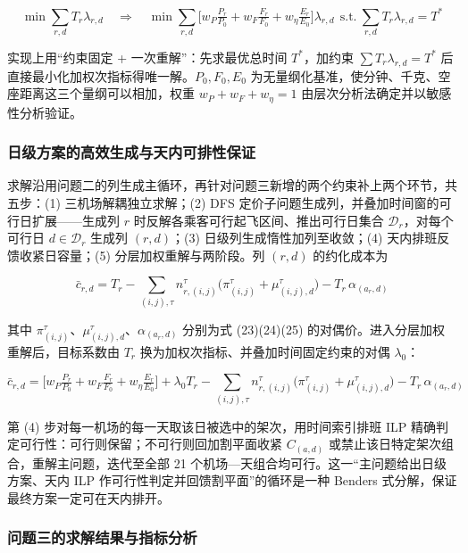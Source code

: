 \documentclass[UTF8,zihao=-4]{ctexart}
\numberwithin{figure}{section}
\numberwithin{table}{section}
\begin{document}
\begin{equation}
  \min \sum_{r,d} T_r\lambda_{r,d}
  \quad\Longrightarrow\quad \min \sum_{r,d}\Big[w_P\tfrac{P_r}{P_0}+w_F\tfrac{F_r}{F_0}+w_\eta\tfrac{E_r}{E_0}\Big]\lambda_{r,d}\ \ \text{s.t.}\ \sum_{r,d}T_r\lambda_{r,d}=T^*
\end{equation}

实现上用“约束固定 + 一次重解”：先求最优总时间 $T^*$，加约束 $\sum T_r\lambda_{r,d}=T^*$ 后直接最小化加权次指标得唯一解。$P_0,F_0,E_0$ 为无量纲化基准，使分钟、千克、空座距离这三个量纲可以相加，权重 $w_P+w_F+w_\eta=1$ 由层次分析法确定并以敏感性分析验证。

\subsubsection{日级方案的高效生成与天内可排性保证}

求解沿用问题二的列生成主循环，再针对问题三新增的两个约束补上两个环节，共五步：(1) 三机场解耦独立求解；(2) DFS 定价子问题生成列，并叠加时间窗的可行日扩展——生成列 $r$ 时反解各乘客可行起飞区间、推出可行日集合 $\mathcal{D}_r$，对每个可行日 $d\in\mathcal{D}_r$ 生成列 $(r,d)$；(3) 日级列生成惰性加列至收敛；(4) 天内排班反馈收紧日容量；(5) 分层加权重解与两阶段。列 $(r,d)$ 的约化成本为

\begin{equation}
  \bar c_{r,d}=T_r-\sum_{(i,j),\tau} n_{r,(i,j)}^{\tau}\big(\pi_{(i,j)}^{\tau}+\mu_{(i,j),d}^{\tau}\big)-T_r\,\alpha_{(a_r,d)}
\end{equation}

其中 $\pi_{(i,j)}^{\tau}$、$\mu_{(i,j),d}^{\tau}$、$\alpha_{(a_r,d)}$ 分别为式 (23)(24)(25) 的对偶价。进入分层加权重解后，目标系数由 $T_r$ 换为加权次指标、并叠加时间固定约束的对偶 $\lambda_0$：

\begin{equation}
  \bar c_{r,d}=\Big[w_P\tfrac{P_r}{P_0}+w_F\tfrac{F_r}{F_0}+w_\eta\tfrac{E_r}{E_0}\Big]+\lambda_0 T_r-\sum_{(i,j),\tau}n_{r,(i,j)}^{\tau}\big(\pi_{(i,j)}^{\tau}+\mu_{(i,j),d}^{\tau}\big)-T_r\,\alpha_{(a_r,d)}
\end{equation}

第 (4) 步对每一机场的每一天取该日被选中的架次，用时间索引排班 ILP 精确判定可行性：可行则保留；不可行则回加割平面收紧 $C_{(a,d)}$ 或禁止该日特定架次组合，重解主问题，迭代至全部 21 个机场—天组合均可行。这一“主问题给出日级方案、天内 ILP 作可行性判定并回馈割平面”的循环是一种 Benders 式分解，保证最终方案一定可在天内排开。

\subsubsection{问题三的求解结果与指标分析}
\end{document}
